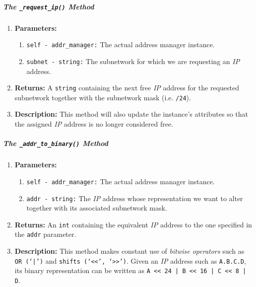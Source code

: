         \subparagraph{The \texttt{\_request\_ip()} Method}
            \begin{enumerate}
                \item \textbf{Parameters:}
                \begin{enumerate}
                    \item \texttt{self - addr\_manager:} The actual address manager instance.
                    \item \texttt{subnet - string:} The subnetwork for which we are  requesting an \textit{IP} address.
                \end{enumerate}
                \item \textbf{Returns:} A \texttt{string} containing the next free \textit{IP} address for the requested subnetwork together with the subnetwork mask (i.e. \texttt{/24}).
                \item \textbf{Description:} This method will also update the instance's attributes so that the assigned \textit{IP} address is no longer considered free.
            \end{enumerate}

        \subparagraph{The \texttt{\_addr\_to\_binary()} Method}
            \begin{enumerate}
                \item \textbf{Parameters:}
                \begin{enumerate}
                    \item \texttt{self - addr\_manager:} The actual address manager instance.
                    \item \texttt{addr - string:} The \textit{IP} address whose representation we want to alter together with its associated subnetwork mask.
                \end{enumerate}
                \item \textbf{Returns:} An \texttt{int} containing the equivalent \textit{IP} address to the one specified in the \texttt{addr} parameter.
                \item \textbf{Description:} This method makes constant use of \textit{bitwise operators} such as \texttt{OR (`|')} and \texttt{shifts (`<<', `>>')}. Given an \textit{IP} address such as \texttt{A.B.C.D}, its binary representation can be written as \texttt{A << 24 | B << 16 | C << 8 | D}.
            \end{enumerate}

